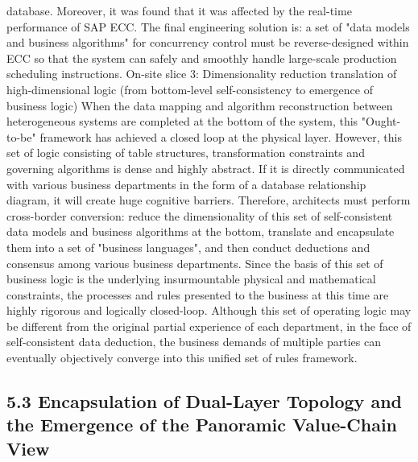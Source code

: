 \documentclass[11pt,a4paper]{article}
\begin{document}
database. Moreover, it was found that it was affected by the real-time performance of SAP ECC. The final engineering solution is: a set of "data models and business algorithms" for concurrency control must be reverse-designed within ECC so that the system can safely and smoothly handle large-scale production scheduling instructions. On-site slice 3: Dimensionality reduction translation of high-dimensional logic (from bottom-level self-consistency to emergence of business logic) When the data mapping and algorithm reconstruction between heterogeneous systems are completed at the bottom of the system, this "Ought-to-be" framework has achieved a closed loop at the physical layer. However, this set of logic consisting of table structures, transformation constraints and governing algorithms is dense and highly abstract. If it is directly communicated with various business departments in the form of a database relationship diagram, it will create huge cognitive barriers. Therefore, architects must perform cross-border conversion: reduce the dimensionality of this set of self-consistent data models and business algorithms at the bottom, translate and encapsulate them into a set of "business languages", and then conduct deductions and consensus among various business departments. Since the basis of this set of business logic is the underlying insurmountable physical and mathematical constraints, the processes and rules presented to the business at this time are highly rigorous and logically closed-loop. Although this set of operating logic may be different from the original partial experience of each department, in the face of self-consistent data deduction, the business demands of multiple parties can eventually objectively converge into this unified set of rules framework.


\subsection*{5.3 Encapsulation of Dual-Layer Topology and the Emergence of the Panoramic Value-Chain View}
\end{document}

